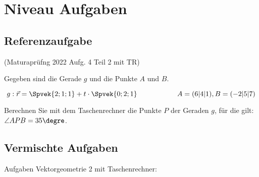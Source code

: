 \section{Niveau Aufgaben}


\subsection{Referenzaufgabe}

(Maturaprüfng 2022 Aufg. 4 Teil 2 mit TR)

Gegeben sind die Gerade $g$ und die Punkte $A$ und $B$.

$$g : \vec{r} = \Spvek{2;1;1} + t\cdot{}\Spvek{0;2;1}\hspace{20mm} A=(6|4| 1), B=(-2|5|7)$$

Berechnen Sie mit dem Taschenrechner die Punkte $P$ der Geraden $g$, für die gilt: $\angle
APB = 35\degre$.





\subsection{Vermischte Aufgaben}
Aufgaben Vektorgeometrie 2 mit Taschenrechner:



